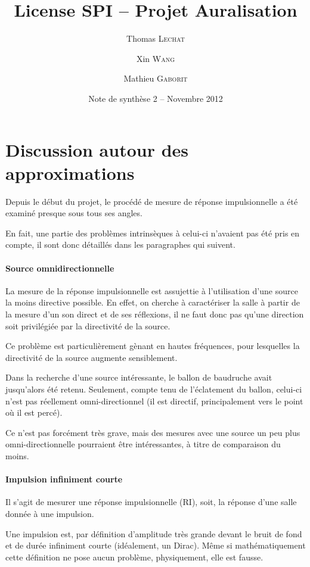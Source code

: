 \documentclass[12pt]{article}
\title{License SPI -- Projet Auralisation}
\author{Thomas \textsc{Lechat} \and Xin \textsc{Wang} \and Mathieu \textsc{Gaborit}}
\date{Note de synthèse 2 -- Novembre 2012}
\begin{document}
 \maketitle

\tableofcontents

\section{Discussion autour des approximations} %

Depuis le début du projet, le procédé de mesure de réponse impulsionnelle a été examiné presque sous tous ses angles.

En fait, une partie des problèmes intrinsèques à celui-ci n'avaient pas été pris en compte, il sont donc détaillés dans
les paragraphes qui suivent.

\paragraph{Source omnidirectionnelle}

La mesure de la réponse impulsionnelle est assujettie à l'utilisation d'une source la moins directive possible.
En effet, on cherche à caractériser la salle à partir de la mesure d'un son direct et de ses réflexions, il ne faut donc
pas qu'une direction soit privilégiée par la directivité de la source.

Ce problème est particulièrement gènant en hautes fréquences, pour lesquelles la directivité de la source augmente
sensiblement.

Dans la recherche d'une source intéressante, le ballon de baudruche avait jusqu'alors été retenu.
Seulement, compte tenu de l'éclatement du ballon, celui-ci n'est pas réellement omni-directionnel (il est directif,
principalement vers le point où il est percé).

Ce n'est pas forcément très grave, mais des mesures avec une source un peu plus omni-directionnelle pourraient être
intéressantes, à titre de comparaison du moins.

\paragraph{Impulsion infiniment courte}

Il s'agit de mesurer une réponse impulsionnelle (RI), soit, la réponse d'une salle donnée à une impulsion.

Une impulsion est, par définition d'amplitude très grande devant le bruit de fond et de durée infiniment courte
(idéalement, un Dirac). Même si mathématiquement cette définition ne pose aucun problème, physiquement, elle est
fausse.
\end{document}
